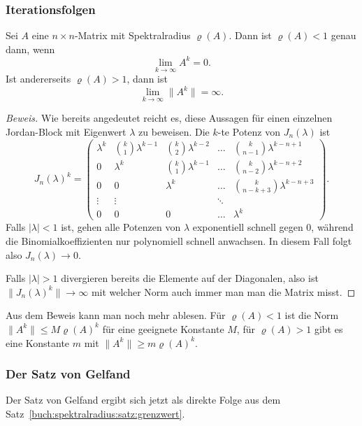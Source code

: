\subsubsection{Iterationsfolgen}
\begin{satz}
\label{buch:spektralradius:satz:grenzwert}
Sei $A$ eine $n\times n$-Matrix mit Spektralradius $\varrho(A)$.
Dann ist $\varrho(A)<1$ genau dann, wenn
\[
\lim_{k\to\infty} A^k = 0.
\]
Ist andererseits $\varrho(A) > 1$, dann ist
\[
\lim_{k\to\infty} \|A^k\|=\infty.
\]
\end{satz}

\begin{proof}[Beweis]
Wie bereits angedeutet reicht es, diese Aussagen für einen einzelnen
Jordan-Block mit Eigenwert $\lambda$ zu beweisen.
Die $k$-te Potenz von $J_n(\lambda)$ ist
\[
J_n(\lambda)^k
=
\begin{pmatrix}
\lambda^k    & \binom{k}{1} \lambda^{k-1} & \binom{k}{2}\lambda^{k-2}&\dots&
\binom{k}{n-1}\lambda^{k-n+1}\\
      0      &\lambda^k & \binom{k}{1} \lambda^{k-1} & \dots &\binom{k}{n-2}\lambda^{k-n+2}\\
      0     &      0    & \lambda^k & \dots &\binom{k}{n-k+3}\lambda^{k-n+3}\\
\vdots      & \vdots    &               &\ddots & \\
     0      &      0    &      0        &\dots  &\lambda^k
\end{pmatrix}.
\]
Falls $|\lambda| < 1$ ist, gehen alle Potenzen von $\lambda$ exponentiell
schnell gegen $0$, während die Binomialkoeffizienten nur polynomiell
schnell anwachsen. 
In diesem Fall folgt also $J_n(\lambda)\to 0$.

Falls $|\lambda| >1$ divergieren bereits die Elemente auf der Diagonalen,
also ist $\|J_n(\lambda)^k\|\to\infty$ mit welcher Norm auch immer man
man die Matrix misst.
\end{proof}

Aus dem Beweis kann man noch mehr ablesen.
Für $\varrho(A)< 1$ ist die Norm $ \|A^k\| \le M \varrho(A)^k$ für eine
geeignete Konstante $M$,
für $\varrho(A) > 1$ gibt es eine Konstante $m$ mit
$\|A^k\| \ge m\varrho(A)^k$.

\subsubsection{Der Satz von Gelfand}
Der Satz von Gelfand ergibt sich jetzt als direkte Folge aus dem
Satz~\ref{buch:spektralradius:satz:grenzwert}.


